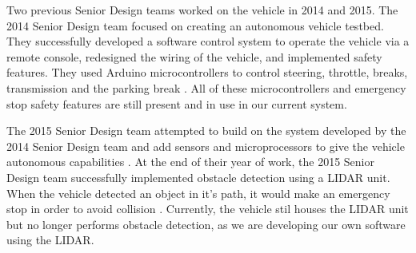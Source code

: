 Two previous Senior Design teams worked on the vehicle in 2014 and 2015.  The 2014 Senior Design team focused on creating an autonomous vehicle testbed.  They successfully developed a software control system to operate the vehicle via a remote console, redesigned the wiring of the vehicle, and implemented safety features.  They used Arduino microcontrollers to control steering, throttle, breaks, transmission and the parking break \cite{rslrover2014}.  All of these microcontrollers and emergency stop safety features are still present and in use in our current system.

The 2015 Senior Design team attempted to build on the system developed by the 2014 Senior Design team and add sensors and microprocessors to  give the vehicle autonomous capabilities \cite{rslrover2015}.  At the end of their year of work, the 2015 Senior Design team successfully implemented obstacle detection using a LIDAR unit.  When the vehicle detected an object in it's path, it would make an emergency stop in order to avoid collision \cite{rslrover2015}. Currently, the vehicle stil houses the LIDAR unit but no longer performs obstacle detection, as we are developing our own software using the LIDAR. 

